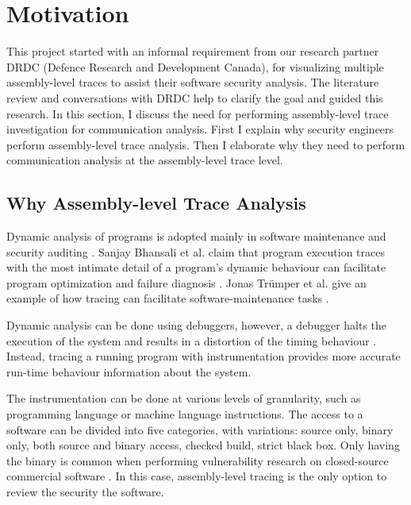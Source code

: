 \documentclass[12pt,oneside]{book}
\begin{document}
\section{Motivation}
This project started with an informal requirement from our research partner DRDC (Defence Research and Development Canada), for visualizing multiple assembly-level traces to assist their software security analysis. The literature review and conversations with DRDC help to clarify the goal and guided this research. In this section, I discuss the need for performing assembly-level trace investigation for communication analysis. First I explain why security engineers perform assembly-level trace analysis. Then I elaborate why they need to perform communication analysis at the assembly-level trace level. 

\subsection{Why Assembly-level Trace Analysis}
Dynamic analysis of programs is adopted mainly in software maintenance and security auditing \cite{zhang2010detecting, cai2016sworddta, somorovsky2016systematic}. Sanjay Bhansali et al. claim that program execution traces with the most intimate detail of a program's dynamic behaviour can facilitate program optimization and failure diagnosis \cite{bhansali2006framework}. Jonas Tr{\"u}mper et al. give an example of how tracing can facilitate software-maintenance tasks \cite{trumper2012maintenance}.

Dynamic analysis can be done using debuggers, however, a debugger halts the execution of the system and results in a distortion of the timing behaviour \cite{trumper2012maintenance}. Instead, tracing a running program with instrumentation provides more accurate run-time behaviour information about the system. 

The instrumentation can be done at various levels of granularity, such as programming language or machine language instructions. The access to a software can be divided into five categories, with variations: source only, binary only, both source and binary access, checked build, strict black box. Only having the binary is common when performing vulnerability research on closed-source commercial software \cite{dowd_art_2006}. In this case, assembly-level tracing is the only option to review the security the software.
\end{document}
